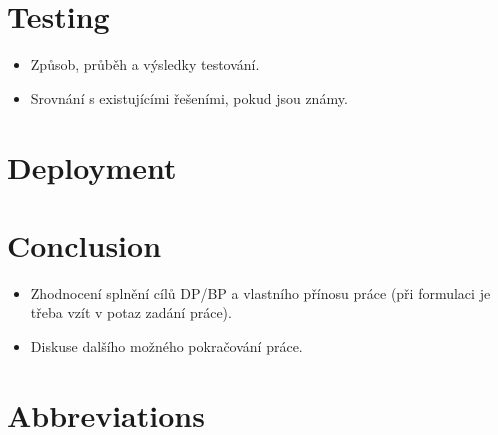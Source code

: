 \documentclass[11pt,twoside,a4paper]{book}
\begin{document}
\chapter{Testing}

\begin{itemize}
 \item Způsob, průběh a výsledky testování.
 \item Srovnání s existujícími řešeními, pokud jsou známy.
\end{itemize} 
 
 \chapter{Deployment}

\chapter{Conclusion}

\begin{itemize}
\item Zhodnocení splnění cílů DP/BP a  vlastního přínosu práce (při formulaci je třeba vzít v potaz zadání práce).
\item Diskuse dalšího možného pokračování práce.

\end{itemize} 	




{
\def\CS{$\cal C\kern-0.1667em\lower.5ex\hbox{$\cal S$}\kern-0.075em $}

}

%


\appendix



\chapter{Abbreviations}
\end{document}
